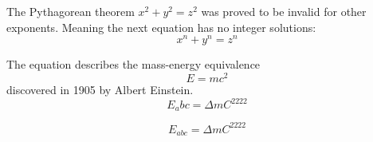 \documentclass{article}
\begin{document}
The Pythagorean theorem \(x^2 + y^2 = z^2\) was
proved to be invalid for other exponents.
Meaning the next equation has no integer solutions:
\[ x^n + y^n = z^n \]


The equation describes the mass-energy equivalence
\begin{equation}
E=mc^2
\end{equation}
discovered in 1905 by Albert Einstein.
\begin{equation}
E_abc=\Delta mC^2222
\end{equation}

\begin{equation}
E_{abc}=\Delta mC^{2222}
\end{equation}
\end{document}
